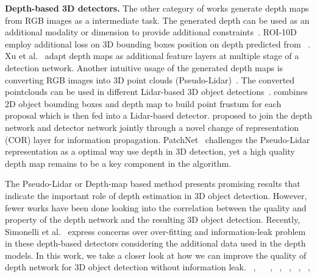 \noindent\textbf{Depth-based 3D detectors.}
The other category of works generate depth maps from RGB images as a intermediate task. 
The generated depth can be used as an additional modality or dimension to provide additional constraints~\cite{manhardt2019roi,xu2018multi}.
ROI-10D~\cite{manhardt2019roi} employ additional loss on 3D bounding boxes position on depth predicted from ~\cite{pillai2019superdepth}.
Xu et al.~\cite{xu2018multi} adapt depth maps as additional feature layers at multiple stage of a detection network.
%
Another intuitive usage of the generated depth maps is converting RGB images into 3D point clouds (Pseudo-Lidar)~\cite{weng2019monocular, qian2020end, wang2020train,ma2019accurate}. The converted pointclouds can be used in different Lidar-based 3D object detections~\cite{wang2020train, qian2020end}. 
\cite{wang2020train} combines 2D object bounding boxes and depth map to build point frustum for each proposal which is then fed into a Lidar-based detector.
\cite{qian2020end} proposed to join the depth network and detector network jointly through a novel change of representation (COR) layer for information propagation.
PatchNet~\cite{ma2020rethinking} challenges the  Pseudo-Lidar representation as a optimal way use depth in 3D detection, yet a high quality depth map remains to be a key component in the algorithm.

The Pseudo-Lidar or Depth-map based method presents promising results that indicate the important role of depth estimation in 3D object detection.
However, fewer works have been done looking into the correlation between the quality and property of the depth network and the resulting 3D object detection.
Recently, Simonelli et al.~\cite{simonelli2020demystifying} express concerns over over-fitting and information-leak problem in these depth-based detectors considering the additional data used in the depth models. 
In this work, we take a closer look at how we can improve the quality of depth network for 3D object detection without information leak. 
 ~\cite{wang2020train}, ~\cite{you2019pseudo} ~\cite{chen2020monopair}, ~\cite{vianney2019refinedmpl}, ~\cite{cai2020monocular},  ~\cite{philion2020lift}, ~\cite{hahner2020quantifying},  ~\cite{qi2018frustum}
 
